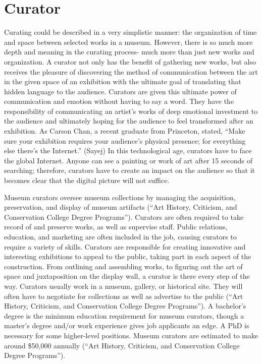 \chapter{Curator}
\begin{multicols}{2}

Curating could be described in a very simplistic manner: the organization of time and space between selected works in a museum. However, there is so much more depth and meaning in the curating process- much more than just new works and organization. A curator not only has the benefit of gathering new works, but also receives the pleasure of discovering the method of communication between the art in the given space of an exhibition with the ultimate goal of translating that hidden language to the audience. Curators are given this ultimate power of communication and emotion without having to say a word. They have the responsibility of communicating an artist’s works of deep emotional investment to the audience and ultimately hoping for the audience to feel transformed after an exhibition. As Carson Chan, a recent graduate from Princeton, stated, “Make sure your exhibition requires your audience’s physical presence; for everything else there’s the Internet.” (Sayej) In this technological age, curators have to face the global Internet. Anyone can see a painting or work of art after 15 seconds of searching; therefore, curators have to create an impact on the audience so that it becomes clear that the digital picture will not suffice. 

Museum curators oversee museum collections by managing the acquisition, preservation, and display of museum artifacts (“Art History, Criticism, and Conservation College Degree Programs”). Curators are often required to take record of and preserve works, as well as supervise staff. Public relations, education, and marketing are often included in the job, causing curators to require a variety of skills. Curators are responsible for creating innovative and interesting exhibitions to appeal to the public, taking part in each aspect of the construction. From outlining and assembling works, to figuring out the art of space and juxtaposition on the display wall, a curator is there every step of the way. Curators usually work in a museum, gallery, or historical site. They will often have to negotiate for collections as well as advertise to the public (“Art History, Criticism, and Conservation College Degree Programs”). A bachelor's degree is the minimum education requirement for museum curators, though a master's degree and/or work experience gives job applicants an edge. A PhD is necessary for some higher-level positions. Museum curators are estimated to make around \$50,000 annually (“Art History, Criticism, and Conservation College Degree Programs”).

\end{multicols}

